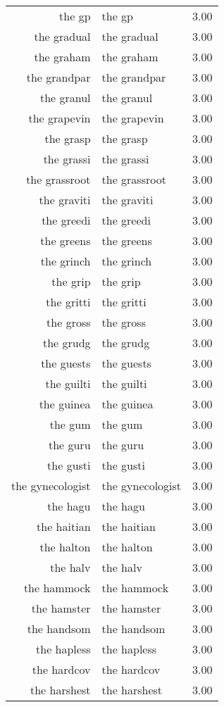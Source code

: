 \begin{table}[ht]
\begin{tabular}{rlr}
  the gp & the gp & 3.00 \\ 
  the gradual & the gradual & 3.00 \\ 
  the graham & the graham & 3.00 \\ 
  the grandpar & the grandpar & 3.00 \\ 
  the granul & the granul & 3.00 \\ 
  the grapevin & the grapevin & 3.00 \\ 
  the grasp & the grasp & 3.00 \\ 
  the grassi & the grassi & 3.00 \\ 
  the grassroot & the grassroot & 3.00 \\ 
  the graviti & the graviti & 3.00 \\ 
  the greedi & the greedi & 3.00 \\ 
  the greens & the greens & 3.00 \\ 
  the grinch & the grinch & 3.00 \\ 
  the grip & the grip & 3.00 \\ 
  the gritti & the gritti & 3.00 \\ 
  the gross & the gross & 3.00 \\ 
  the grudg & the grudg & 3.00 \\ 
  the guests & the guests & 3.00 \\ 
  the guilti & the guilti & 3.00 \\ 
  the guinea & the guinea & 3.00 \\ 
  the gum & the gum & 3.00 \\ 
  the guru & the guru & 3.00 \\ 
  the gusti & the gusti & 3.00 \\ 
  the gynecologist & the gynecologist & 3.00 \\ 
  the hagu & the hagu & 3.00 \\ 
  the haitian & the haitian & 3.00 \\ 
  the halton & the halton & 3.00 \\ 
  the halv & the halv & 3.00 \\ 
  the hammock & the hammock & 3.00 \\ 
  the hamster & the hamster & 3.00 \\ 
  the handsom & the handsom & 3.00 \\ 
  the hapless & the hapless & 3.00 \\ 
  the hardcov & the hardcov & 3.00 \\ 
  the harshest & the harshest & 3.00 \\ 

\end{tabular}
\end{table}
